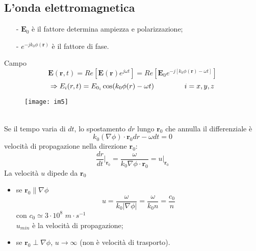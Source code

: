 \documentclass[a4paper]{article}
\begin{document}
\subsection*{L'onda elettromagnetica}
\begin{itemize}
\item[-] $\textbf{E}_0$ è il fattore determina ampiezza e polarizzazione;
\item[-] $e^{-jk_0\phi(\textbf{r})}$ è il fattore di fase. 
\end{itemize}
Campo
\begin{equation*}
\textbf{E}(\textbf{r},t)=Re\left[\textbf{E}(\textbf{r})e^{j\omega t}\right]=Re\left[\textbf{E}_0e^{-j[k_0\phi(\textbf{r})-\omega t]}\right]
\end{equation*}
\begin{equation*}
\Rightarrow E_{i}(r,t)=E_{0_i}\cos(k_0\phi(r)-\omega t)\hspace{15mm}i=x,y,z
\end{equation*}
\begin{figure}[ht] 
\centering
\texttt{[image: im5]}
\end{figure}
\\Se il tempo varia di $dt$, lo spostamento $dr$ lungo $\textbf{r}_0$ che annulla il differenziale è
\begin{equation*}
k_0(\nabla\phi)\cdot\textbf{r}_0dr-\omega dt=0
\end{equation*}
velocità di propagazione nella direzione $\textbf{r}_0$:
\begin{equation*}
\frac{dr}{dt}\biggl|_{\textbf{r}_0}=\frac{\omega}{k_0\nabla\phi\cdot\textbf{r}_0}=u\big|_{\textbf{r}_0}
\end{equation*}
La velocità $u$ dipede da $\textbf{r}_0$
\begin{itemize}
\item se $\textbf{r}_0\parallel\nabla\phi$
\begin{equation*}
u=\frac{\omega}{k_0|\nabla\phi|}=\frac{\omega}{k_0n}=\frac{c_0}{n}
\end{equation*}
con $c_0\simeq 3\cdot10^8\,\,m\cdot s^{-1}$\\
$u_{min}$ è la velocità di propagazione;
\item se $\textbf{r}_0\perp\nabla\phi$, $u\rightarrow\infty$ (non è velocità di trasporto).
\end{itemize}
\end{document}
